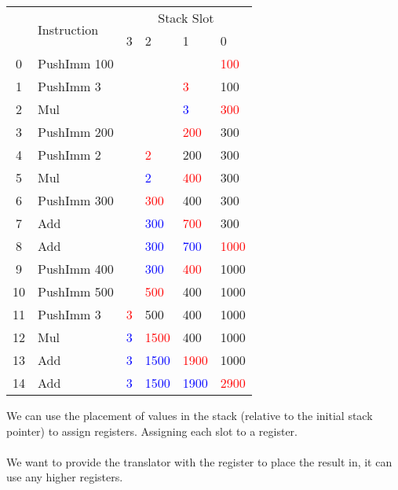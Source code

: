 \documentclass{report}
\newcommand{\hot}[1]{\textcolor{red}{#1}}
\newcommand{\old}[1]{\textcolor{blue}{#1}}
\begin{document}
        \begin{center}
            \begin{tabular}{c l | l l l l}
                & \multirow{2}{*}{Instruction} & \multicolumn{4}{c}{Stack Slot} \\
                & & 3 & 2 & 1 & 0 \\
                \hline
                0 & PushImm 100 &       &          &          & \hot{100}\\ 
                1 & PushImm 3   &       &          &   \hot{3}&       100\\ 
                2 & Mul         &       &          &  \old{3} & \hot{300}\\ 
                3 & PushImm 200 &       &          & \hot{200}&       300\\ 
                4 & PushImm 2   &       &\hot{2}   &       200&       300\\ 
                5 & Mul         &       &   \old{2}& \hot{400}&       300\\ 
                6 & PushImm 300 &       &\hot{300} &       400&       300\\ 
                7 & Add         &       & \old{300}& \hot{700}&       300\\ 
                8 & Add         &       & \old{300}& \old{700}&\hot{1000}\\ 
                9 & PushImm 400 &       & \old{300}& \hot{400}&      1000\\ 
               10 & PushImm 500 &       &\hot{500} &       400&      1000\\ 
               11 & PushImm 3   &\hot{3}&       500&       400&      1000\\ 
               12 & Mul         &\old{3}&\hot{1500}&       400&      1000\\ 
               13 & Add         &\old{3}&\old{1500}&\hot{1900}&      1000\\ 
               14 & Add         &\old{3}&\old{1500}&\old{1900}&\hot{2900}\\
            \end{tabular}
        \end{center}
        We can use the placement of values in the stack (relative to the initial stack pointer) to assign registers. Assigning each slot to a register.
        \\
        \\ We want to provide the translator with the register to place the result in, it can use any higher registers.
\end{document}

